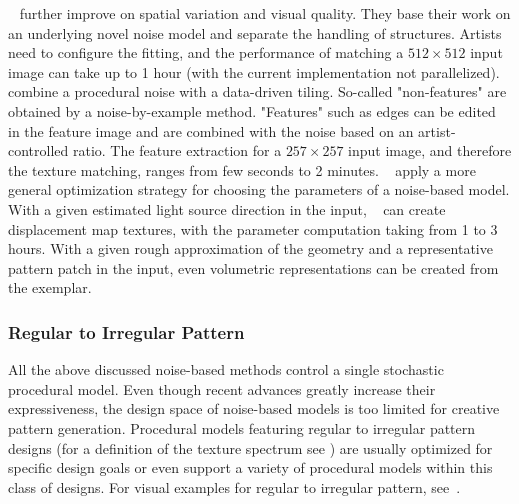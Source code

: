 {\citeauthor*{guingo_2017_btm}~\cite{guingo_2017_btm} further improve on spatial variation and visual quality. They base their work on an underlying novel noise model and separate the handling of structures. Artists need to configure the fitting, and the performance of matching a $512\times512$ input image can take up to 1 hour (with the current implementation not parallelized). \citeauthor*{kang_2017_fpt}~\cite{kang_2017_fpt} combine a procedural noise with a data-driven tiling. So-called "non-features" are obtained by a noise-by-example method. "Features" such as edges can be edited in the feature image and are combined with the noise based on an artist-controlled ratio. The feature extraction for a $257\times257$ input image, and therefore the texture matching, ranges from few seconds to 2 minutes. \citeauthor*{gilet_2010_ias}~\cite{gilet_2010_ias} apply a more general optimization strategy for choosing the parameters of a noise-based model. With a given estimated light source direction in the input, \citeauthor*{gilet_2010_ias}~\cite{gilet_2010_ias} can create displacement map textures, with the parameter computation taking from 1 to 3 hours. With a given rough approximation of the geometry and a representative pattern patch in the input, even volumetric representations can be created from the exemplar.}



\subsubsection{Regular to Irregular Pattern}
\label{subsubsec:analysis_distribution_and_repetition_regular}

All the above discussed noise-based methods control a single stochastic procedural model. Even though recent advances greatly increase their expressiveness, the design space of noise-based models is too limited for creative pattern generation. Procedural models featuring regular to irregular pattern designs (for a definition of the texture spectrum see \cite{lin_2006_qeo}) are usually optimized for specific design goals or even support a variety of procedural models within this class of designs. For visual examples for regular to irregular pattern, see~.

